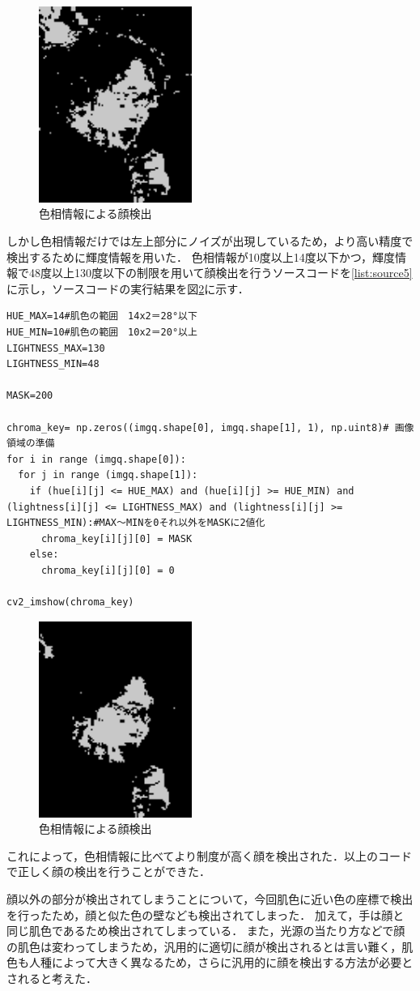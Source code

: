 \documentclass[uplatex]{jsarticle}
\begin{document}
\begin{figure}[htbp]
  \begin{center}
    \includegraphics[clip,width=5cm]{figures/result4.png}
    \caption{色相情報による顔検出}
    \label{fig:result4}
  \end{center}
\end{figure}

しかし色相情報だけでは左上部分にノイズが出現しているため，より高い精度で検出するために輝度情報を用いた．
色相情報が10度以上14度以下かつ，輝度情報で48度以上130度以下の制限を用いて顔検出を行うソースコードを\ref{list:source5}に示し，ソースコードの実行結果を図\ref{fig:result5}に示す．
\begin{lstlisting}[caption=色相および輝度による顔検出,label=list:source5]
HUE_MAX=14#肌色の範囲　14x2＝28°以下
HUE_MIN=10#肌色の範囲　10x2＝20°以上
LIGHTNESS_MAX=130
LIGHTNESS_MIN=48

MASK=200

chroma_key= np.zeros((imgq.shape[0], imgq.shape[1], 1), np.uint8)# 画像領域の準備
for i in range (imgq.shape[0]):
  for j in range (imgq.shape[1]):
    if (hue[i][j] <= HUE_MAX) and (hue[i][j] >= HUE_MIN) and (lightness[i][j] <= LIGHTNESS_MAX) and (lightness[i][j] >= LIGHTNESS_MIN):#MAX〜MINを0それ以外をMASKに2値化
      chroma_key[i][j][0] = MASK
    else:
      chroma_key[i][j][0] = 0

cv2_imshow(chroma_key)
\end{lstlisting}

\begin{figure}[htbp]
  \begin{center}
    \includegraphics[clip,width=5cm]{figures/result5.png}
    \caption{色相情報による顔検出}
    \label{fig:result5}
  \end{center}
\end{figure}
これによって，色相情報に比べてより制度が高く顔を検出された．以上のコードで正しく顔の検出を行うことができた．

顔以外の部分が検出されてしまうことについて，今回肌色に近い色の座標で検出を行ったため，顔と似た色の壁なども検出されてしまった．
加えて，手は顔と同じ肌色であるため検出されてしまっている．
また，光源の当たり方などで顔の肌色は変わってしまうため，汎用的に適切に顔が検出されるとは言い難く，肌色も人種によって大きく異なるため，さらに汎用的に顔を検出する方法が必要とされると考えた．
\end{document}
